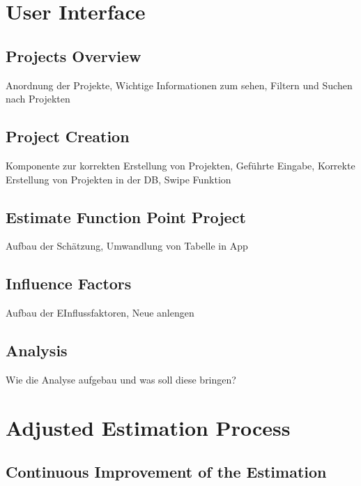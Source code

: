 \section{User Interface}

\subsection{Projects Overview}

Anordnung der Projekte, Wichtige Informationen zum sehen, Filtern und Suchen nach Projekten

\subsection{Project Creation}

Komponente zur korrekten Erstellung von Projekten, Geführte Eingabe, Korrekte Erstellung von Projekten in der DB, Swipe Funktion

\subsection{Estimate Function Point Project}

Aufbau der Schätzung, Umwandlung von Tabelle in App

\subsection{Influence Factors}

Aufbau der EInflussfaktoren, Neue anlengen

\subsection{Analysis}

Wie die Analyse aufgebau und was soll diese bringen?

\section{Adjusted Estimation Process}\label{adjustedEstimationProcess}


\subsection{Continuous Improvement of the Estimation}

